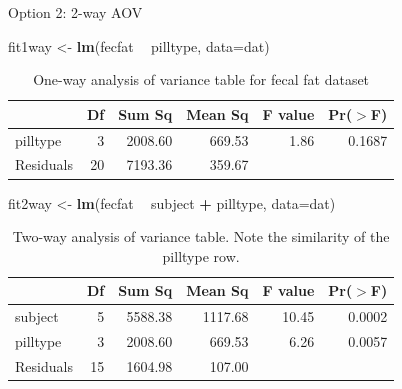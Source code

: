 \documentclass[
  ignorenonframetext,
]{beamer}
\newenvironment{Shaded}{\begin{snugshade}}{\end{snugshade}}
\newcommand{\DataTypeTok}[1]{\textcolor[rgb]{0.13,0.29,0.53}{#1}}
\newcommand{\KeywordTok}[1]{\textcolor[rgb]{0.13,0.29,0.53}{\textbf{#1}}}
\newcommand{\NormalTok}[1]{#1}
\newcommand{\OperatorTok}[1]{\textcolor[rgb]{0.81,0.36,0.00}{\textbf{#1}}}
\newcommand{\StringTok}[1]{\textcolor[rgb]{0.31,0.60,0.02}{#1}}
\begin{document}
\begin{frame}[fragile]{Option 2: 2-way AOV}
\protect\hypertarget{option-2-2-way-aov-1}{}

\footnotesize

\begin{Shaded}
\begin{Highlighting}[]
\NormalTok{fit1way <-}\StringTok{ }\KeywordTok{lm}\NormalTok{(fecfat }\OperatorTok{~}\StringTok{ }\NormalTok{pilltype, }\DataTypeTok{data=}\NormalTok{dat)}
\end{Highlighting}
\end{Shaded}

\begin{table}[ht]
\centering
\begin{tabular}{lrrrrr}
  \hline
 & Df & Sum Sq & Mean Sq & F value & Pr($>$F) \\ 
  \hline
pilltype & 3 & 2008.60 & 669.53 & 1.86 & 0.1687 \\ 
  Residuals & 20 & 7193.36 & 359.67 &  &  \\ 
   \hline
\end{tabular}
\caption{One-way analysis of variance table for fecal fat dataset} 
\end{table}

\begin{Shaded}
\begin{Highlighting}[]
\NormalTok{fit2way <-}\StringTok{ }\KeywordTok{lm}\NormalTok{(fecfat }\OperatorTok{~}\StringTok{ }\NormalTok{subject }\OperatorTok{+}\StringTok{ }\NormalTok{pilltype, }\DataTypeTok{data=}\NormalTok{dat)}
\end{Highlighting}
\end{Shaded}

\begin{table}[ht]
\centering
\begin{tabular}{lrrrrr}
  \hline
 & Df & Sum Sq & Mean Sq & F value & Pr($>$F) \\ 
  \hline
subject & 5 & 5588.38 & 1117.68 & 10.45 & 0.0002 \\ 
  pilltype & 3 & 2008.60 & 669.53 & 6.26 & 0.0057 \\ 
  Residuals & 15 & 1604.98 & 107.00 &  &  \\ 
   \hline
\end{tabular}
\caption{Two-way analysis of variance table. Note the similarity of the pilltype row.} 
\label{2}
\end{table}

\end{frame}
\end{document}
